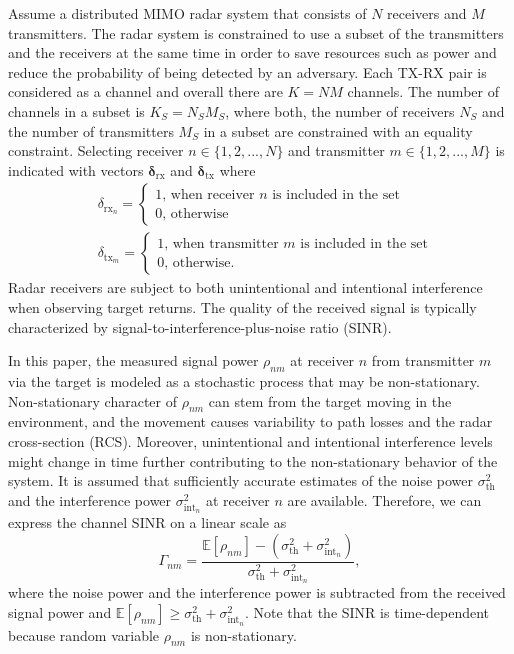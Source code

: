 \documentclass[english, 12pt, a4paper, elec, utf8, a-1b, online]{aaltothesis}
\newcommand{\E}[1]{\mathbb{E}\left[ #1 \right]}
\newcommand{\thnoise}{\sigma^2_{\text{th}}}
\newcommand{\eintnoise}{\sigma^2_{\text{int}_{n}}}
\newcommand{\esinrexp}{\Gamma_{nm}}
\newcommand{\easvtx}{\delta_{\text{tx}_m}}
\newcommand{\vasvtx}{\boldsymbol{\delta}_{\text{tx}}}
\newcommand{\easvrx}{\delta_{\text{rx}_n}}
\newcommand{\vasvrx}{\boldsymbol{\delta}_{\text{rx}}}
\newcommand{\esp}{\rho_{nm}}
\begin{document}
Assume a distributed MIMO radar system that consists of $N$ receivers and $M$ transmitters.
The radar system is constrained to use a subset of the transmitters and the receivers at the same time in order to save resources such as power and reduce the probability of being detected by an adversary.
Each TX-RX pair is considered as a channel and overall there are $K=NM$ channels.
The number of channels in a subset is $K_S = N_S M_S$, where both, the number of receivers $N_S$ and the number of transmitters $M_S$ in a subset are constrained with an equality constraint.
Selecting receiver $n \in \{1, 2, ..., N\}$ and transmitter $m \in \{1,2, ..., M\}$ is indicated with vectors $\vasvrx$ and $\vasvtx$ where
\begin{align}
    &\easvrx = 
    \left\{\begin{array}{l}
        1 \text{, when receiver $n$ is included in the set} \\
        0 \text{, otherwise}
    \end{array}\right.\\
    &\easvtx = 
    \left\{\begin{array}{l}
        1 \text{, when transmitter $m$ is included in the set} \\
        0 \text{, otherwise.}
    \end{array}\right.
\end{align}
Radar receivers are subject to both unintentional and intentional interference when observing target returns.
The quality of the received signal is typically characterized by signal-to-interference-plus-noise ratio (SINR).

In this paper, the measured signal power $\esp$ at receiver $n$ from transmitter $m$ via the target is modeled as a stochastic process that may be non-stationary. 
Non-stationary character of $\esp$ can stem from the target moving in the environment, and 
the movement causes variability to path losses and the radar cross-section (RCS).
Moreover, unintentional and intentional interference levels might change in time further contributing to the non-stationary behavior of the system.
It is assumed that sufficiently accurate estimates of the noise power $\thnoise$ and the interference power $\eintnoise$ at receiver $n$ are available.
Therefore, we can express the channel SINR on a linear scale as
\begin{equation}\label{eq:sinr}
     \esinrexp = \frac{\E{\esp} - (\thnoise + \eintnoise)}{\thnoise + \eintnoise },
\end{equation}
where the noise power and the interference power is subtracted from the received signal power and $\E{\esp} \geq \thnoise + \eintnoise$.
Note that the SINR is time-dependent because random variable $\esp$ is non-stationary. 
\end{document}
